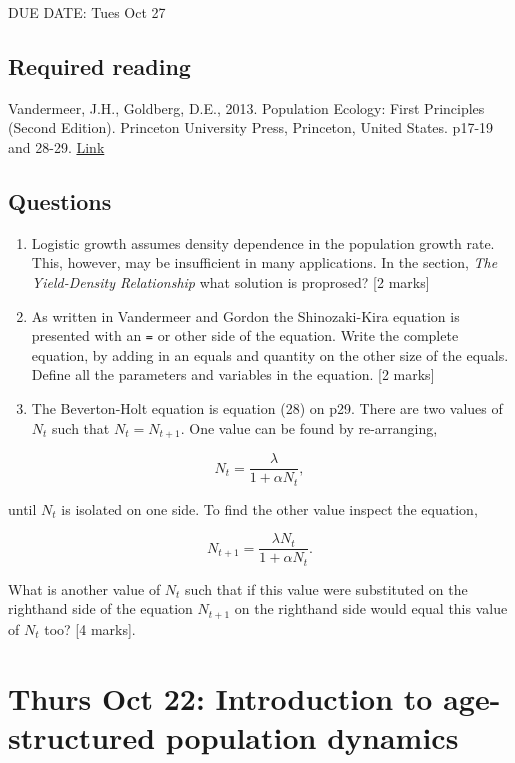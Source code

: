 \documentclass[]{book}
\begin{document}
DUE DATE: Tues Oct 27

\section{Required reading}\label{required-reading}

Vandermeer, J.H., Goldberg, D.E., 2013. Population Ecology: First
Principles (Second Edition). Princeton University Press, Princeton,
United States. p17-19 and 28-29.
\href{https://ebookcentral-proquest-com.qe2a-proxy.mun.ca/lib/mun/detail.action?docID=1205619}{Link}

\section{Questions}\label{questions}

\begin{enumerate}
\def\labelenumi{\arabic{enumi}.}
\item
  Logistic growth assumes density dependence in the population growth
  rate. This, however, may be insufficient in many applications. In the
  section, \emph{The Yield-Density Relationship} what solution is
  proprosed? {[}2 marks{]}
\item
  As written in Vandermeer and Gordon the Shinozaki-Kira equation is
  presented with an \texttt{=} or other side of the equation. Write the
  complete equation, by adding in an equals and quantity on the other
  size of the equals. Define all the parameters and variables in the
  equation. {[}2 marks{]}
\item
  The Beverton-Holt equation is equation (28) on p29. There are two
  values of \(N_t\) such that \(N_t = N_{t+1}\). One value can be found
  by re-arranging,
\end{enumerate}

\[
N_t = \frac{\lambda}{1+\alpha N_t},
\]

until \(N_t\) is isolated on one side. To find the other value inspect
the equation,

\[
N_{t+1} = \frac{\lambda N_t}{1+\alpha N_t}.
\]

What is another value of \(N_t\) such that if this value were
substituted on the righthand side of the equation \(N_{t+1}\) on the
righthand side would equal this value of \(N_t\) too? {[}4 marks{]}.

\chapter{Thurs Oct 22: Introduction to age-structured population
dynamics}\label{thurs-oct-22-introduction-to-age-structured-population-dynamics}
\end{document}
